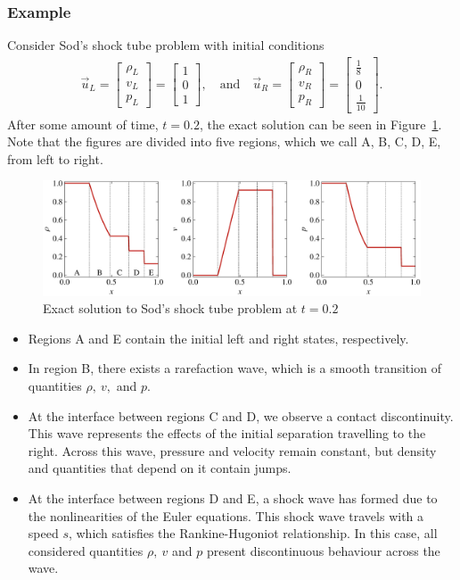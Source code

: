 \subsubsection{Example}
Consider Sod's shock tube problem with initial conditions
\begin{align}
	\vec u_L = 
	\begin{bmatrix}
		\rho_L \\ v_L \\ p_L 
	\end{bmatrix}
	= 
	\begin{bmatrix}
		1 \\ 0 \\ 1
	\end{bmatrix},
	\quad \text{and} \quad 
	\vec u_R = 
	\begin{bmatrix}
		\rho_R \\ v_R \\ p_R
	\end{bmatrix}
	= 
	\begin{bmatrix}
		\frac{1}{8} \\ 0 \\ \frac{1}{10}
	\end{bmatrix}.
\end{align}
After some amount of time, $t=0.2$, the exact solution can be seen in Figure~\ref{fig:shocktubesol}. Note that the figures are divided into five regions, which we call A, B, C, D, E, from left to right. 
\begin{figure}[htbp]
	\centering
	\includegraphics[width=\linewidth]{Pictures/sod_shock_tube_solution}
	\caption{Exact solution to Sod's shock tube problem at $t=0.2$}
	\label{fig:shocktubesol}
\end{figure}
\begin{itemize}
	\item Regions A and E contain the initial left and right states, respectively.
	\item In region B, there exists a rarefaction wave, which is a smooth transition of quantities $\rho,~v,$ and $p$. 
	\item At the interface between regions C and D, we observe a contact discontinuity. This wave represents the effects of the initial separation travelling to the right. Across this wave, pressure and velocity remain constant, but density and quantities that depend on it contain jumps.
	\item At the interface between regions D and E, a shock wave has formed due to the nonlinearities of the Euler equations. This shock wave travels with a speed $s$, which satisfies the Rankine-Hugoniot relationship. In this case, all considered quantities $\rho,~v$ and $p$ present discontinuous behaviour across the wave. 
\end{itemize}

